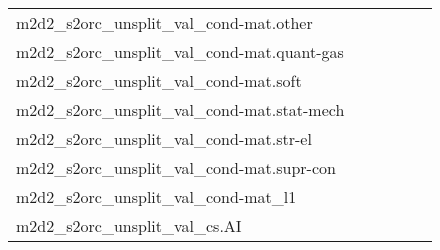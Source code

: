 {\begin{longtable}{m{6cm}m{1.7cm}m{1.7cm}m{1.7cm}m{1.7cm}m{1.7cm}}
	m2d2\_s2orc\_unsplit\_val\_cond-mat.other  & \colorbox[HTML]{d1ec9f}{\makebox[\mywidth][c]{11.87}} & \colorbox[HTML]{e5f4ab}{\makebox[\mywidth][c]{11.96}} & \colorbox[HTML]{ffffe5}{\makebox[\mywidth][c]{13.55}} & \colorbox[HTML]{c6e89a}{\makebox[\mywidth][c]{11.83}} & \colorbox[HTML]{77c578}{\makebox[\mywidth][c]{11.65}}\\
	m2d2\_s2orc\_unsplit\_val\_cond-mat.quant-gas  & \colorbox[HTML]{c6e89a}{\makebox[\mywidth][c]{11.67}} & \colorbox[HTML]{e1f3a9}{\makebox[\mywidth][c]{11.78}} & \colorbox[HTML]{ffffe5}{\makebox[\mywidth][c]{13.37}} & \colorbox[HTML]{c3e698}{\makebox[\mywidth][c]{11.67}} & \colorbox[HTML]{77c578}{\makebox[\mywidth][c]{11.50}}\\
	m2d2\_s2orc\_unsplit\_val\_cond-mat.soft  & \colorbox[HTML]{bfe596}{\makebox[\mywidth][c]{12.18}} & \colorbox[HTML]{cdeb9d}{\makebox[\mywidth][c]{12.23}} & \colorbox[HTML]{ffffe5}{\makebox[\mywidth][c]{13.93}} & \colorbox[HTML]{bee496}{\makebox[\mywidth][c]{12.18}} & \colorbox[HTML]{77c578}{\makebox[\mywidth][c]{12.02}}\\
	m2d2\_s2orc\_unsplit\_val\_cond-mat.stat-mech  & \colorbox[HTML]{bfe596}{\makebox[\mywidth][c]{12.03}} & \colorbox[HTML]{e0f2a8}{\makebox[\mywidth][c]{12.14}} & \colorbox[HTML]{ffffe5}{\makebox[\mywidth][c]{13.60}} & \colorbox[HTML]{d1ec9f}{\makebox[\mywidth][c]{12.08}} & \colorbox[HTML]{77c578}{\makebox[\mywidth][c]{11.89}}\\
	m2d2\_s2orc\_unsplit\_val\_cond-mat.str-el  & \colorbox[HTML]{c6e89a}{\makebox[\mywidth][c]{10.39}} & \colorbox[HTML]{e2f3a9}{\makebox[\mywidth][c]{10.50}} & \colorbox[HTML]{ffffe5}{\makebox[\mywidth][c]{11.98}} & \colorbox[HTML]{cae99c}{\makebox[\mywidth][c]{10.41}} & \colorbox[HTML]{77c578}{\makebox[\mywidth][c]{10.22}}\\
	m2d2\_s2orc\_unsplit\_val\_cond-mat.supr-con  & \colorbox[HTML]{dff2a7}{\makebox[\mywidth][c]{11.57}} & \colorbox[HTML]{edf8b2}{\makebox[\mywidth][c]{11.66}} & \colorbox[HTML]{ffffe5}{\makebox[\mywidth][c]{13.13}} & \colorbox[HTML]{d8efa2}{\makebox[\mywidth][c]{11.53}} & \colorbox[HTML]{77c578}{\makebox[\mywidth][c]{11.30}}\\
	m2d2\_s2orc\_unsplit\_val\_cond-mat\_l1  & \colorbox[HTML]{bfe596}{\makebox[\mywidth][c]{12.54}} & \colorbox[HTML]{e1f3a9}{\makebox[\mywidth][c]{12.67}} & \colorbox[HTML]{ffffe5}{\makebox[\mywidth][c]{14.28}} & \colorbox[HTML]{ccea9c}{\makebox[\mywidth][c]{12.58}} & \colorbox[HTML]{77c578}{\makebox[\mywidth][c]{12.38}}\\
	m2d2\_s2orc\_unsplit\_val\_cs.AI  & \colorbox[HTML]{77c578}{\makebox[\mywidth][c]{11.71}} & \colorbox[HTML]{e0f2a8}{\makebox[\mywidth][c]{12.09}} & \colorbox[HTML]{ffffe5}{\makebox[\mywidth][c]{14.20}} & \colorbox[HTML]{d4eea0}{\makebox[\mywidth][c]{12.01}} & \colorbox[HTML]{98d485}{\makebox[\mywidth][c]{11.79}}\\

\end{longtable}}

